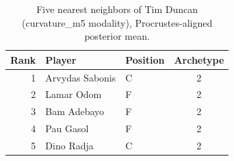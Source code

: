 \begin{table}[htbp]
  \centering\small
  \begin{tabular}{rllc}
    \toprule
    Rank & Player & Position & Archetype \\
    \midrule
    1 & Arvydas Sabonis & C & 2 \\
    2 & Lamar Odom & F & 2 \\
    3 & Bam Adebayo & F & 2 \\
    4 & Pau Gasol & F & 2 \\
    5 & Dino Radja & C & 2 \\
    \bottomrule
  \end{tabular}
  \caption{Five nearest neighbors of Tim Duncan (curvature_m5 modality), Procrustes-aligned posterior mean.}
  \label{tab:Tim_Duncan_neighbors_curvature_m5}
\end{table}

